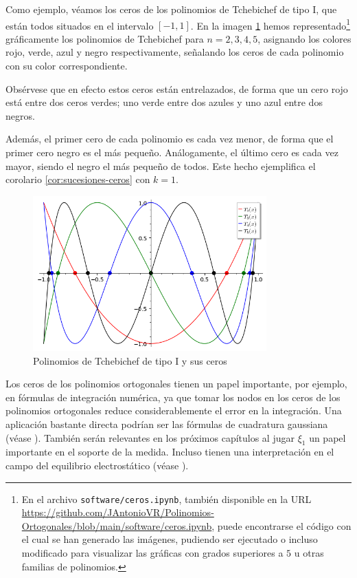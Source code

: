 \begin{ejemplo}
    Como ejemplo, véamos los ceros de los polinomios de Tchebichef de tipo I, que están todos situados en el intervalo $[-1,1]$. En la imagen \ref{img:ejemplo-ceros} hemos representado\footnote{En el archivo \texttt{software/ceros.ipynb}, también disponible en la URL \url{https://github.com/JAntonioVR/Polinomios-Ortogonales/blob/main/software/ceros.ipynb}, puede encontrarse el código con el cual se han generado las imágenes, pudiendo ser ejecutado o incluso modificado para visualizar las gráficas con grados superiores a $5$ u otras familias de polinomios.} gráficamente los polinomios de Tchebichef para $n=2,3,4,5$, asignando los colores rojo, verde, azul y negro respectivamente, señalando los ceros de cada polinomio con su color correspondiente. 

    Obsérvese que en efecto estos ceros están entrelazados, de forma que un cero rojo está entre dos ceros verdes; uno verde entre dos azules y uno azul entre dos negros.

    Además, el primer cero de cada polinomio es cada vez menor, de forma que el primer cero negro es el más pequeño. Análogamente, el último cero es cada vez mayor, siendo el negro el más pequeño de todos. Este hecho ejemplifica el corolario \ref{cor:sucesiones-ceros} con $k=1$.
    
    \begin{figure}
        \centering
        \includegraphics[width=9cm]{img/C1/ceros.png}
        \caption{Polinomios de Tchebichef de tipo I y sus ceros}
        \label{img:ejemplo-ceros}
    \end{figure}

    \newpage

    
\end{ejemplo}

Los ceros de los polinomios ortogonales tienen un papel importante, por ejemplo, en fórmulas de integración numérica, ya que tomar los nodos en los ceros de los polinomios ortogonales reduce considerablemente el error en la integración. Una aplicación bastante directa podrían ser las fórmulas de cuadratura gaussiana (véase \cite[Ch. I, Sección 6]{chihara}). También serán relevantes en los próximos capítulos al jugar $\xi_1$ un papel importante en el soporte de la medida. Incluso tienen una interpretación en el campo del equilibrio electrostático (véase \cite{Steinerberger}).